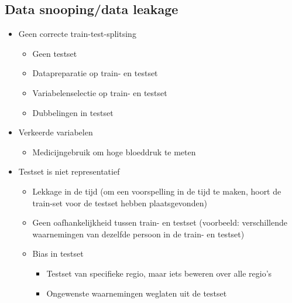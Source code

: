 {\subsection{Data snooping/data leakage}
\begin{itemize}
    \item Geen correcte train-test-splitsing
    \begin{itemize}
        \item Geen testset
        \item Datapreparatie op train- en testset
        \item Variabelenselectie op train- en testset
        \item Dubbelingen in testset
    \end{itemize}
    \item Verkeerde variabelen
    \begin{itemize}
        \item Medicijngebruik om hoge bloeddruk te meten
    \end{itemize}
    \item Testset is niet representatief
    \begin{itemize}
        \item Lekkage in de tijd (om een voorspelling in de tijd te maken, hoort de train-set voor de testset hebben plaatsgevonden)
        \item Geen oafhankelijkheid tussen train- en testset (voorbeeld: verschillende waarnemingen van dezelfde persoon in de train- en testset)
        \item Bias in testset
        \begin{itemize}
            \item Testset van specifieke regio, maar iets beweren over alle regio's
            \item Ongewenste waarnemingen weglaten uit de testset
        \end{itemize}
    \end{itemize}
\end{itemize}
}
